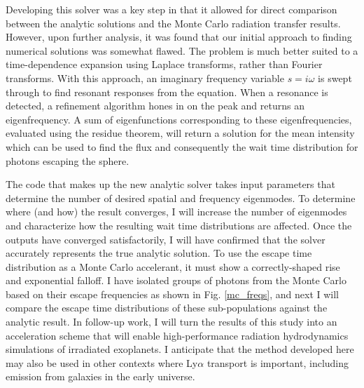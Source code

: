 \documentclass[onecolumn]{aastex63}
\begin{document}
Developing this solver was a key step in that it allowed for direct comparison between the analytic solutions and the Monte Carlo radiation transfer results. However, upon further analysis, it was found that our initial approach to finding numerical solutions was somewhat flawed. The problem is much better suited to a time-dependence expansion using Laplace transforms, rather than Fourier transforms. With this approach, an imaginary frequency variable $s = i\omega$ is swept through to find resonant responses from the equation. When a resonance is detected, a refinement algorithm hones in on the peak and returns an eigenfrequency. A sum of eigenfunctions corresponding to these eigenfrequencies, evaluated using the residue theorem, will return a solution for the mean intensity which can be used to find the flux and consequently the wait time distribution for photons escaping the sphere.

The code that makes up the new analytic solver takes input parameters that determine the number of desired spatial and frequency eigenmodes. To determine where (and how) the result converges, I will increase the number of eigenmodes and characterize how the resulting wait time distributions are affected. Once the outputs have converged satisfactorily, I will have confirmed that the solver accurately represents the true analytic solution. To use the escape time distribution as a Monte Carlo accelerant, it must show a correctly-shaped rise and exponential falloff. I have isolated groups of photons from the Monte Carlo based on their escape frequencies as shown in Fig. \ref{mc_freqs}, and next I will compare the escape time distributions of these sub-populations against the analytic result. In follow-up work, I will turn the results of this study into an acceleration scheme that will enable high-performance radiation hydrodynamics simulations of irradiated exoplanets. I anticipate that the method developed here may also be used in other contexts where Ly$\alpha$ transport is important, including emission from galaxies in the early universe.
\end{document}
